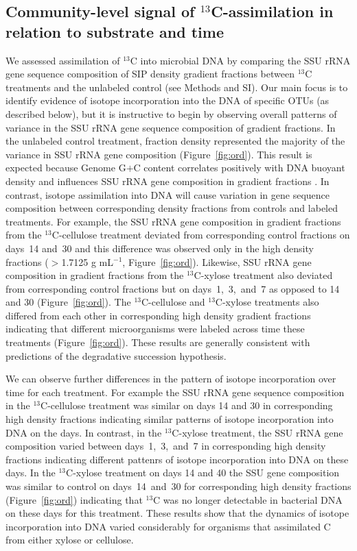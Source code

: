 \subsection{Community-level signal of $^{13}$C-assimilation in relation to substrate and time}
We assessed assimilation of $^{13}$C into microbial DNA by comparing the SSU
rRNA gene sequence composition of SIP density gradient fractions between
$^{13}$C treatments and the unlabeled control (see Methods and SI).  Our main
focus is to identify evidence of isotope incorporation into the DNA of specific
OTUs (as described below), but it is instructive to begin by observing overall
patterns of variance in the SSU rRNA gene sequence composition of gradient
fractions. In the unlabeled control treatment, fraction density represented the
majority of the variance in SSU rRNA gene composition (Figure~\ref{fig:ord}). This
result is expected because Genome G$+$C content correlates positively with DNA
buoyant density and influences SSU rRNA gene composition in gradient fractions
\citep{Buckley_2007}. In contrast, isotope assimilation into DNA will cause
variation in gene sequence composition between corresponding density fractions
from controls and labeled treatments. For example, the SSU rRNA gene
composition in gradient fractions from the $^{13}$C-cellulose
treatment deviated from corresponding control fractions on days~14 and~30
and this difference was observed only in the high
density fractions ($>$1.7125 g mL$^{-1}$, Figure~\ref{fig:ord}). Likewise, SSU
rRNA gene composition in gradient fractions from the $^{13}$C-xylose treatment
also deviated from corresponding control fractions but on days~1,~3,~and~7
as opposed to 14 and 30 (Figure~\ref{fig:ord}). The $^{13}$C-cellulose
and $^{13}$C-xylose treatments also differed from each other in corresponding
high density gradient fractions indicating that different
microorganisms were labeled across time these treatments (Figure~\ref{fig:ord}).
These results are generally consistent with predictions of the degradative
succession hypothesis.

We can observe further differences in the pattern of isotope incorporation over
time for each treatment. For example the SSU rRNA gene sequence
composition in the $^{13}$C-cellulose treatment was similar on days 14 and 30 in 
corresponding high density fractions indicating similar patterns of isotope
incorporation into DNA on the days. In contrast, in the $^{13}$C-xylose treatment,
the SSU rRNA gene composition varied between
days~1,~3,~and~7 in corresponding high density fractions indicating different pattenrs
of isotope incorporation into DNA on these days. In the
$^{13}$C-xylose treatment on days 14 and 40 the SSU gene composition
was similar to control on days~14~and~30 for corresponding high density
fractions (Figure~\ref{fig:ord}) indicating that $^{13}$C was no longer
detectable in bacterial DNA on these days for this treatment. These results
show that the dynamics of isotope incorporation into DNA varied considerably for
organisms that assimilated C from either xylose or cellulose.

